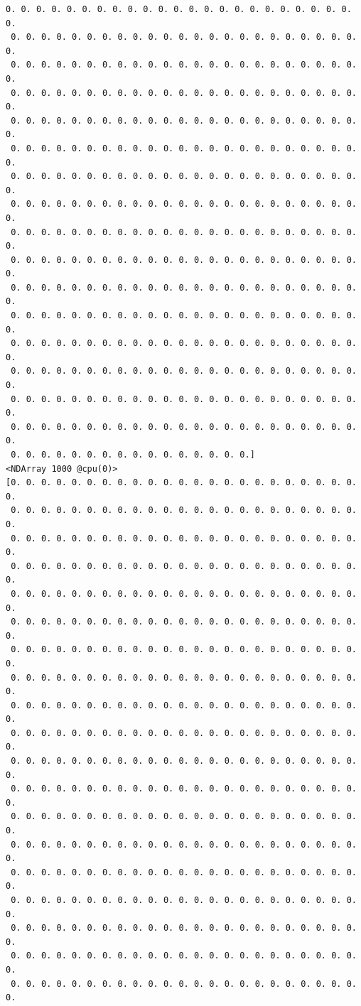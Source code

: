 \documentclass[11pt]{article}
\begin{document}
\begin{Verbatim}[commandchars=\\\{\}]
 0. 0. 0. 0. 0. 0. 0. 0. 0. 0. 0. 0. 0. 0. 0. 0. 0. 0. 0. 0. 0. 0. 0. 0.
 0. 0. 0. 0. 0. 0. 0. 0. 0. 0. 0. 0. 0. 0. 0. 0. 0. 0. 0. 0. 0. 0. 0. 0.
 0. 0. 0. 0. 0. 0. 0. 0. 0. 0. 0. 0. 0. 0. 0. 0. 0. 0. 0. 0. 0. 0. 0. 0.
 0. 0. 0. 0. 0. 0. 0. 0. 0. 0. 0. 0. 0. 0. 0. 0. 0. 0. 0. 0. 0. 0. 0. 0.
 0. 0. 0. 0. 0. 0. 0. 0. 0. 0. 0. 0. 0. 0. 0. 0. 0. 0. 0. 0. 0. 0. 0. 0.
 0. 0. 0. 0. 0. 0. 0. 0. 0. 0. 0. 0. 0. 0. 0. 0. 0. 0. 0. 0. 0. 0. 0. 0.
 0. 0. 0. 0. 0. 0. 0. 0. 0. 0. 0. 0. 0. 0. 0. 0. 0. 0. 0. 0. 0. 0. 0. 0.
 0. 0. 0. 0. 0. 0. 0. 0. 0. 0. 0. 0. 0. 0. 0. 0. 0. 0. 0. 0. 0. 0. 0. 0.
 0. 0. 0. 0. 0. 0. 0. 0. 0. 0. 0. 0. 0. 0. 0. 0. 0. 0. 0. 0. 0. 0. 0. 0.
 0. 0. 0. 0. 0. 0. 0. 0. 0. 0. 0. 0. 0. 0. 0. 0. 0. 0. 0. 0. 0. 0. 0. 0.
 0. 0. 0. 0. 0. 0. 0. 0. 0. 0. 0. 0. 0. 0. 0. 0. 0. 0. 0. 0. 0. 0. 0. 0.
 0. 0. 0. 0. 0. 0. 0. 0. 0. 0. 0. 0. 0. 0. 0. 0. 0. 0. 0. 0. 0. 0. 0. 0.
 0. 0. 0. 0. 0. 0. 0. 0. 0. 0. 0. 0. 0. 0. 0. 0. 0. 0. 0. 0. 0. 0. 0. 0.
 0. 0. 0. 0. 0. 0. 0. 0. 0. 0. 0. 0. 0. 0. 0. 0. 0. 0. 0. 0. 0. 0. 0. 0.
 0. 0. 0. 0. 0. 0. 0. 0. 0. 0. 0. 0. 0. 0. 0. 0. 0. 0. 0. 0. 0. 0. 0. 0.
 0. 0. 0. 0. 0. 0. 0. 0. 0. 0. 0. 0. 0. 0. 0. 0. 0. 0. 0. 0. 0. 0. 0. 0.
 0. 0. 0. 0. 0. 0. 0. 0. 0. 0. 0. 0. 0. 0. 0. 0.]
<NDArray 1000 @cpu(0)> 
[0. 0. 0. 0. 0. 0. 0. 0. 0. 0. 0. 0. 0. 0. 0. 0. 0. 0. 0. 0. 0. 0. 0. 0.
 0. 0. 0. 0. 0. 0. 0. 0. 0. 0. 0. 0. 0. 0. 0. 0. 0. 0. 0. 0. 0. 0. 0. 0.
 0. 0. 0. 0. 0. 0. 0. 0. 0. 0. 0. 0. 0. 0. 0. 0. 0. 0. 0. 0. 0. 0. 0. 0.
 0. 0. 0. 0. 0. 0. 0. 0. 0. 0. 0. 0. 0. 0. 0. 0. 0. 0. 0. 0. 0. 0. 0. 0.
 0. 0. 0. 0. 0. 0. 0. 0. 0. 0. 0. 0. 0. 0. 0. 0. 0. 0. 0. 0. 0. 0. 0. 0.
 0. 0. 0. 0. 0. 0. 0. 0. 0. 0. 0. 0. 0. 0. 0. 0. 0. 0. 0. 0. 0. 0. 0. 0.
 0. 0. 0. 0. 0. 0. 0. 0. 0. 0. 0. 0. 0. 0. 0. 0. 0. 0. 0. 0. 0. 0. 0. 0.
 0. 0. 0. 0. 0. 0. 0. 0. 0. 0. 0. 0. 0. 0. 0. 0. 0. 0. 0. 0. 0. 0. 0. 0.
 0. 0. 0. 0. 0. 0. 0. 0. 0. 0. 0. 0. 0. 0. 0. 0. 0. 0. 0. 0. 0. 0. 0. 0.
 0. 0. 0. 0. 0. 0. 0. 0. 0. 0. 0. 0. 0. 0. 0. 0. 0. 0. 0. 0. 0. 0. 0. 0.
 0. 0. 0. 0. 0. 0. 0. 0. 0. 0. 0. 0. 0. 0. 0. 0. 0. 0. 0. 0. 0. 0. 0. 0.
 0. 0. 0. 0. 0. 0. 0. 0. 0. 0. 0. 0. 0. 0. 0. 0. 0. 0. 0. 0. 0. 0. 0. 0.
 0. 0. 0. 0. 0. 0. 0. 0. 0. 0. 0. 0. 0. 0. 0. 0. 0. 0. 0. 0. 0. 0. 0. 0.
 0. 0. 0. 0. 0. 0. 0. 0. 0. 0. 0. 0. 0. 0. 0. 0. 0. 0. 0. 0. 0. 0. 0. 0.
 0. 0. 0. 0. 0. 0. 0. 0. 0. 0. 0. 0. 0. 0. 0. 0. 0. 0. 0. 0. 0. 0. 0. 0.
 0. 0. 0. 0. 0. 0. 0. 0. 0. 0. 0. 0. 0. 0. 0. 0. 0. 0. 0. 0. 0. 0. 0. 0.
 0. 0. 0. 0. 0. 0. 0. 0. 0. 0. 0. 0. 0. 0. 0. 0. 0. 0. 0. 0. 0. 0. 0. 0.
 0. 0. 0. 0. 0. 0. 0. 0. 0. 0. 0. 0. 0. 0. 0. 0. 0. 0. 0. 0. 0. 0. 0. 0.
 0. 0. 0. 0. 0. 0. 0. 0. 0. 0. 0. 0. 0. 0. 0. 0. 0. 0. 0. 0. 0. 0. 0. 0.

\end{Verbatim}
\end{document}
